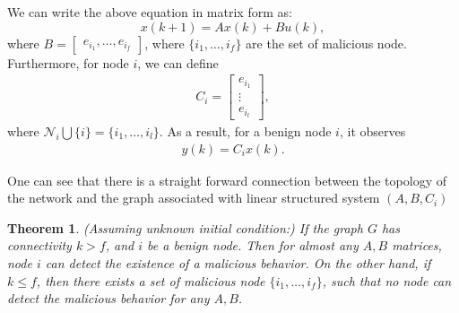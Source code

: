 \documentclass{article}
\newtheorem{theorem}{Theorem}
\begin{document}
We can write the above equation in matrix form as:
\begin{displaymath}
  x(k+1) = A x(k) + Bu(k),
\end{displaymath}
where $B = \begin{bmatrix}e_{i_1},\dots,e_{i_f}\end{bmatrix}$, where $\{i_1,\dots,i_f\}$ are the set of malicious node. Furthermore, for node $i$, we can define
\begin{align*}
  C_i = \begin{bmatrix}
    e_{i_1}\\
    \vdots\\
    e_{i_l} 
  \end{bmatrix},
\end{align*}
where $\mathcal N_i \bigcup \{i\} = \{i_1,\dots,i_l\}$. As a result, for a benign node $i$, it observes
\begin{align*}
 y(k) = C_i x(k).
\end{align*}

One can see that there is a straight forward connection between the topology of the network and the graph associated with linear structured system $(A,B,C_i)$

\begin{theorem}
  (Assuming unknown initial condition:) If the graph $G$ has connectivity $k > f$, and $i$ be a benign node. Then for almost any $A,B$ matrices, node $i$ can detect the existence of a malicious behavior. On the other hand, if $k \leq f$, then there exists a set of malicious node $\{i_1,\dots,i_f\}$, such that no node can detect the malicious behavior for any $A,B$.
\end{theorem}
\end{document}
